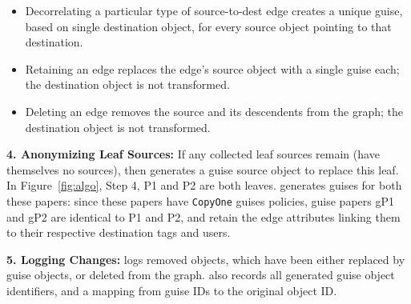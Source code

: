          \begin{itemize}
             \item Decorrelating a particular type of source-to-dest edge creates a unique guise, based
                on single destination object, for every source object pointing to that destination.

            \item Retaining an edge replaces the edge's source object with a single guise
                each; the destination object is not transformed.
            
            \item Deleting an edge removes the source and its descendents from the graph; the
                destination object is not transformed.
         \end{itemize}

           \vspace{0.5\baselineskip}\noindent\textbf{4. Anonymizing Leaf Sources:}
        If any collected leaf sources remain (have themselves no sources), then \sys generates a
        guise source object to replace this leaf.
        In Figure~\ref{fig:algo}, Step 4, P1 and P2 are both leaves. \sys generates guises for both
        these papers: since these papers have \texttt{CopyOne} guises policies, guise papers gP1 and
        gP2 are identical to P1 and P2, and retain the edge attributes linking them to their
        respective destination tags and users.

    \vspace{0.5\baselineskip}\noindent\textbf{5. Logging Changes:} 
    \sys logs removed objects, which have been either replaced by guise objects, or deleted
    from the graph. \sys also records all generated guise object identifiers, and a mapping from
    guise IDs to the original object ID. 

